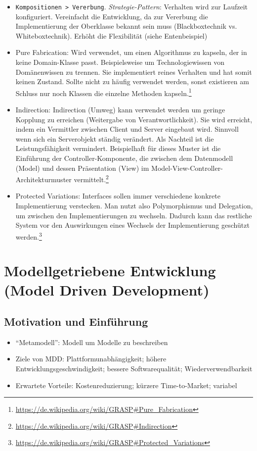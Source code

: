 \begin{itemize}
	\item \texttt{Kompositionen > Vererbung}. \textit{Strategie-Pattern}: Verhalten wird zur Laufzeit konfiguriert. Vereinfacht die Entwicklung, da zur Vererbung die Implementierung der Oberklasse bekannt sein muss (Blackboxtechnik vs. Whiteboxtechnik). Erhöht die Flexibilität (siehe Entenbeispiel)
	\item Pure Fabrication: Wird verwendet, um einen Algorithmus zu kapseln, der in keine Domain-Klasse passt. Beispielsweise um Technologiewissen von Domänenwissen zu trennen. Sie implementiert reines Verhalten und hat somit keinen Zustand. Sollte nicht zu häufig verwendet werden, sonst existieren am Schluss nur noch Klassen die einzelne Methoden kapseln.\footnote{\url{https://de.wikipedia.org/wiki/GRASP\#Pure_Fabrication}}
	\item Indirection: Indirection (Umweg) kann verwendet werden um geringe Kopplung zu erreichen (Weitergabe von Verantwortlichkeit). Sie wird erreicht, indem ein Vermittler zwischen Client und Server eingebaut wird. Sinnvoll wenn sich ein Serverobjekt ständig verändert. Als Nachteil ist die Leistungsfähigkeit vermindert. Beispielhaft für dieses Muster ist die Einführung der Controller-Komponente, die zwischen dem Datenmodell (Model) und dessen Präsentation (View) im Model-View-Controller-Architekturmuster vermittelt.\footnote{\url{https://de.wikipedia.org/wiki/GRASP\#Indirection}}
	\item Protected Variations: Interfaces sollen immer verschiedene konkrete Implementierung verstecken. Man nutzt also Polymorphismus und Delegation, um zwischen den Implementierungen zu wechseln. Dadurch kann das restliche System vor den Auswirkungen eines Wechsels der Implementierung geschützt werden.\footnote{\url{https://de.wikipedia.org/wiki/GRASP\#Protected_Variations}}
\end{itemize}



\section{Modellgetriebene Entwicklung (Model Driven Development)}

\subsection{Motivation und Einführung}
\begin{itemize}
	\item "`Metamodell"': Modell um Modelle zu beschreiben
	\item Ziele von MDD: Plattformunabhängigkeit; höhere Entwicklungsgeschwindigkeit; bessere Softwarequalität; Wiederverwendbarkeit
	\item Erwartete Vorteile: Kostenreduzierung; kürzere Time-to-Market; variabel
\end{itemize}


